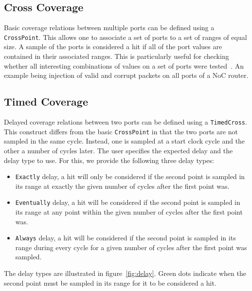 \documentclass[conference]{IEEEtran}
\begin{document}
\subsection{Cross Coverage}
Basic coverage relations between multiple ports can be defined using a \texttt{CrossPoint}. 
This allows one to associate a set of ports to a set of ranges of equal size.  
A sample of the ports is considered a hit if all of the port values are contained in their associated ranges. This is particularly useful for checking whether all interesting combinations of values on a set of ports were tested~\cite{hdlverify}. An example being injection of valid and corrupt packets on all ports of a NoC router. %

\subsection{Timed Coverage}
Delayed coverage relations between two ports can be defined using a \texttt{TimedCross}. This construct differs from the basic \texttt{CrossPoint} in that the two ports are not sampled in the same cycle. Instead, one is sampled at a start clock cycle and the other a number of cycles later. The user specifies the expected delay and the delay type to use. For this, we provide the following three delay types:%
\begin{itemize}
 \item \texttt{Exactly} delay, a hit will only be considered if the second point is sampled in its range at exactly the given number of cycles after the first point was.
 \item \texttt{Eventually} delay, a hit will be considered if the second point is sampled in its range at any point within the given number of cycles after the first point was.  
 \item \texttt{Always} delay, a hit will be considered if the second point is sampled in its range during every cycle for a given number of cycles after the first point was sampled.
\end{itemize}  
The delay types are illustrated in figure~\ref{fig:delay}. Green dots indicate when the second point must be sampled in its range for it to be considered a hit. %
\end{document}
